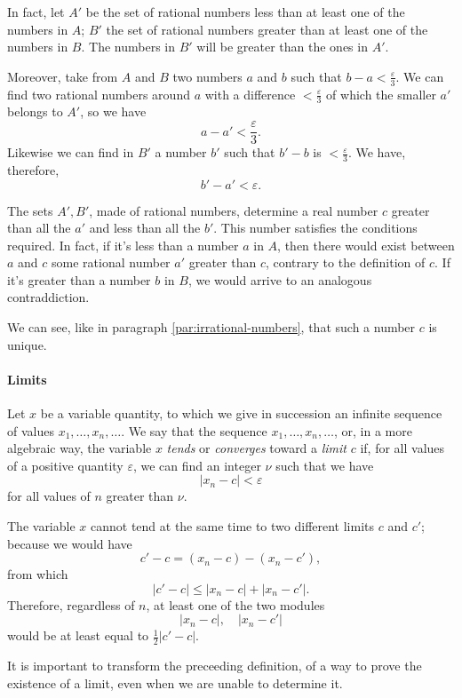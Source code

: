 \documentclass[10pt,letterpaper]{book}
\renewcommand\epsilon{\varepsilon}
\theoremstyle{definition}
\begin{document}
In fact, let $A'$ be the set of rational numbers
less than at least one of the numbers in $A$; $B'$ the set of rational numbers greater than at least one of the numbers in $B$. The numbers in $B'$ will be greater than the ones in $A'$.

Moreover, take from $A$ and $B$ two numbers $a$ and $b$ such that $b-a<\frac \epsilon 3$. We can find two rational numbers around $a$ with a difference $<\frac \epsilon 3$ of which the smaller $a'$ belongs to $A'$, so we have
\[
  a - a' < \frac \epsilon 3.
\]
Likewise we can find in $B'$ a number $b'$ such that $b'-b$ is $<\frac\epsilon 3$. We have, therefore,
\[
  b' - a' < \epsilon.
\]

The sets $A',B'$, made of rational numbers, determine a real number $c$ greater than all the $a'$ and less than all the $b'$. This number satisfies the conditions required. In fact, if it's less than a number $a$ in $A$, then there would exist between $a$ and $c$ some rational number $a'$ greater than $c$, contrary to the definition of $c$. If it's greater than a number $b$ in $B$, we would arrive to an analogous contraddiction.

We can see, like in paragraph \ref{par:irrational-numbers}, that such a number $c$ is unique.

\paragraph{Limits} Let $x$ be a variable quantity, to which we give in succession an infinite sequence of values $x_1,\dots,x_n,\dots$. We say that the sequence $x_1,\dots,x_n,\dots$, or, in a more algebraic way, the variable $x$ \textit{tends} or \textit{converges} toward a \textit{limit} $c$ if, for all values of a positive quantity $\epsilon$, we can find an integer $\nu$ such that we have
\[
  |x_n-c| < \epsilon
\]
for all values of $n$ greater than $\nu$.


The variable $x$ cannot tend at the same time to two different limits $c$ and $c'$; because we would have
\[
  c'-c = (x_n-c)-(x_n-c'),
\]
from which
\[
  |c' - c| \leq |x_n-c| + |x_n-c'|.
\]
Therefore, regardless of $n$, at least one of the two modules
\[
  |x_n-c|,\quad|x_n-c'|
\]
would be at least equal to $\frac 1 2 |c'-c|$.

It is important to transform the preceeding definition, of a way to prove the existence of a limit, even when we are unable to determine it.
\end{document}
